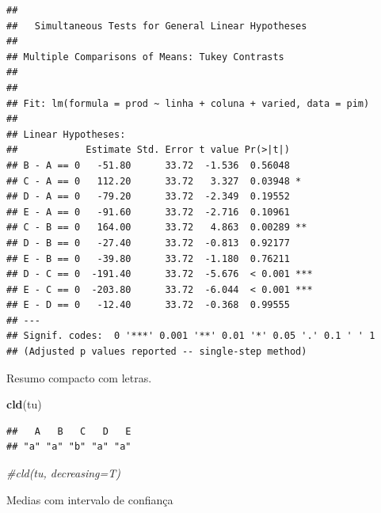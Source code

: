 \documentclass[
]{book}
\newenvironment{Shaded}{\begin{snugshade}}{\end{snugshade}}
\newcommand{\CommentTok}[1]{\textcolor[rgb]{0.56,0.35,0.01}{\textit{#1}}}
\newcommand{\DataTypeTok}[1]{\textcolor[rgb]{0.13,0.29,0.53}{#1}}
\newcommand{\KeywordTok}[1]{\textcolor[rgb]{0.13,0.29,0.53}{\textbf{#1}}}
\newcommand{\NormalTok}[1]{#1}
\newcommand{\OperatorTok}[1]{\textcolor[rgb]{0.81,0.36,0.00}{\textbf{#1}}}
\newcommand{\StringTok}[1]{\textcolor[rgb]{0.31,0.60,0.02}{#1}}
\begin{document}
\begin{verbatim}
## 
##   Simultaneous Tests for General Linear Hypotheses
## 
## Multiple Comparisons of Means: Tukey Contrasts
## 
## 
## Fit: lm(formula = prod ~ linha + coluna + varied, data = pim)
## 
## Linear Hypotheses:
##            Estimate Std. Error t value Pr(>|t|)    
## B - A == 0   -51.80      33.72  -1.536  0.56048    
## C - A == 0   112.20      33.72   3.327  0.03948 *  
## D - A == 0   -79.20      33.72  -2.349  0.19552    
## E - A == 0   -91.60      33.72  -2.716  0.10961    
## C - B == 0   164.00      33.72   4.863  0.00289 ** 
## D - B == 0   -27.40      33.72  -0.813  0.92177    
## E - B == 0   -39.80      33.72  -1.180  0.76211    
## D - C == 0  -191.40      33.72  -5.676  < 0.001 ***
## E - C == 0  -203.80      33.72  -6.044  < 0.001 ***
## E - D == 0   -12.40      33.72  -0.368  0.99555    
## ---
## Signif. codes:  0 '***' 0.001 '**' 0.01 '*' 0.05 '.' 0.1 ' ' 1
## (Adjusted p values reported -- single-step method)
\end{verbatim}

Resumo compacto com letras.

\begin{Shaded}
\begin{Highlighting}[]
\KeywordTok{cld}\NormalTok{(tu)}
\end{Highlighting}
\end{Shaded}

\begin{verbatim}
##   A   B   C   D   E 
## "a" "a" "b" "a" "a"
\end{verbatim}

\begin{Shaded}
\begin{Highlighting}[]
\CommentTok{#cld(tu, decreasing=T)}
\end{Highlighting}
\end{Shaded}

Medias com intervalo de confiança

\begin{Shaded}
\end{Shaded}
\end{document}
